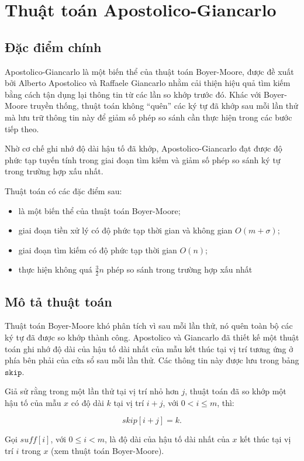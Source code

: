 \section{Thuật toán Apostolico-Giancarlo}

\subsection{Đặc điểm chính}
Apostolico-Giancarlo là một biến thể của thuật toán Boyer-Moore, được đề xuất bởi Alberto Apostolico và Raffaele Giancarlo nhằm cải thiện hiệu quả tìm kiếm bằng cách tận dụng lại thông tin từ các lần so khớp trước đó. Khác với Boyer-Moore truyền thống, thuật toán không “quên” các ký tự đã khớp sau mỗi lần thử mà lưu trữ thông tin này để giảm số phép so sánh cần thực hiện trong các bước tiếp theo.

Nhờ cơ chế ghi nhớ độ dài hậu tố đã khớp, Apostolico-Giancarlo đạt được độ phức tạp tuyến tính trong giai đoạn tìm kiếm và giảm số phép so sánh ký tự trong trường hợp xấu nhất.

Thuật toán có các đặc điểm sau:

\begin{itemize}
    \item là một biến thể của thuật toán Boyer-Moore;
    \item giai đoạn tiền xử lý có độ phức tạp thời gian và không gian $O(m + \sigma)$;
    \item giai đoạn tìm kiếm có độ phức tạp thời gian $O(n)$;
    \item thực hiện không quá $\frac{3}{2}n$ phép so sánh trong trường hợp xấu nhất
\end{itemize}

\subsection{Mô tả thuật toán}
Thuật toán Boyer-Moore khó phân tích vì sau mỗi lần thử, nó quên toàn bộ các ký tự đã được so khớp thành công. Apostolico và Giancarlo đã thiết kế một thuật toán ghi nhớ độ dài của hậu tố dài nhất của mẫu kết thúc tại vị trí tương ứng ở phía bên phải của cửa sổ sau mỗi lần thử. Các thông tin này được lưu trong bảng $\texttt{skip}$.

Giả sử rằng trong một lần thử tại vị trí nhỏ hơn $j$, thuật toán đã so khớp một hậu tố của mẫu $x$ có độ dài $k$ tại vị trí $i + j$, với $0 < i \leq m$, thì:

\[
skip[i + j] = k.
\]

Gọi $suff[i]$, với $0 \leq i < m$, là độ dài của hậu tố dài nhất của $x$ kết thúc tại vị trí $i$ trong $x$ (xem thuật toán Boyer-Moore).

